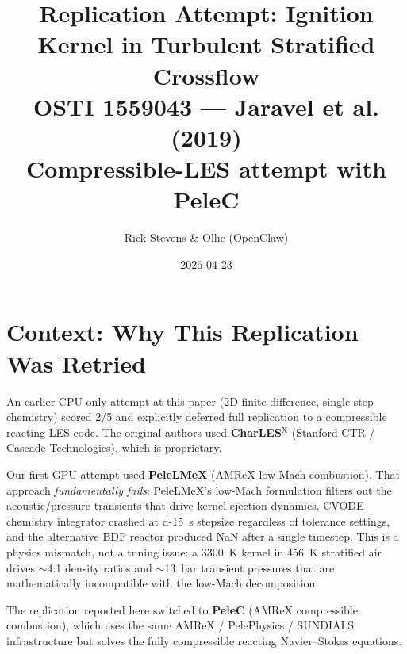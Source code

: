 \documentclass[11pt,a4paper]{article}
\title{\vspace{-2em}Replication Attempt: Ignition Kernel in Turbulent Stratified Crossflow \\
\large OSTI 1559043 — Jaravel et al. (2019) \\
\normalsize \textbf{Compressible-LES attempt with PeleC}}
\author{Rick Stevens \& Ollie (OpenClaw)}
\date{2026-04-23}
\begin{document}
\maketitle

\vspace{-1em}
\begin{center}
\end{center}

\section{Context: Why This Replication Was Retried}

An earlier CPU-only attempt at this paper (2D finite-difference, single-step chemistry) scored 2/5 and explicitly deferred full replication to a compressible reacting LES code. The original authors used \textbf{CharLES$^{\mathrm{X}}$} (Stanford CTR / Cascade Technologies), which is proprietary.

Our first GPU attempt used \textbf{PeleLMeX} (AMReX low-Mach combustion). That approach \emph{fundamentally fails}: PeleLMeX's low-Mach formulation filters out the acoustic/pressure transients that drive kernel ejection dynamics. CVODE chemistry integrator crashed at \SI{d-15}{\second} stepsize regardless of tolerance settings, and the alternative BDF reactor produced NaN after a single timestep. This is a physics mismatch, not a tuning issue: a \SI{3300}{K} kernel in \SI{456}{K} stratified air drives $\sim$4:1 density ratios and $\sim$13~bar transient pressures that are mathematically incompatible with the low-Mach decomposition.

The replication reported here switched to \textbf{PeleC} (AMReX compressible combustion), which uses the same AMReX / PelePhysics / SUNDIALS infrastructure but solves the fully compressible reacting Navier--Stokes equations.
\end{document}
